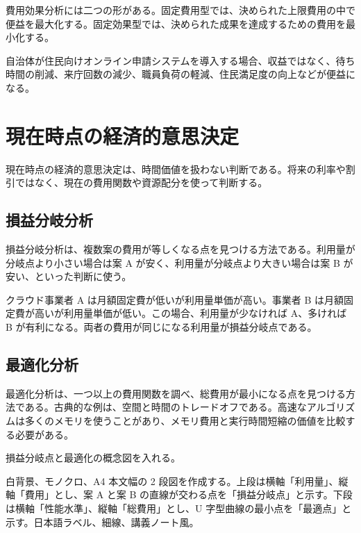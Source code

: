 \documentclass[a4paper,11pt]{article}
\begin{document}
費用効果分析には二つの形がある。固定費用型では、決められた上限費用の中で便益を最大化する。固定効果型では、決められた成果を達成するための費用を最小化する。

\begin{examplebox}
自治体が住民向けオンライン申請システムを導入する場合、収益ではなく、待ち時間の削減、来庁回数の減少、職員負荷の軽減、住民満足度の向上などが便益になる。
\end{examplebox}

\section{現在時点の経済的意思決定}

現在時点の経済的意思決定は、時間価値を扱わない判断である。将来の利率や割引ではなく、現在の費用関数や資源配分を使って判断する。

\subsection{損益分岐分析}

損益分岐分析は、複数案の費用が等しくなる点を見つける方法である。利用量が分岐点より小さい場合は案 A が安く、利用量が分岐点より大きい場合は案 B が安い、といった判断に使う。

\begin{examplebox}
クラウド事業者 A は月額固定費が低いが利用量単価が高い。事業者 B は月額固定費が高いが利用量単価が低い。この場合、利用量が少なければ A、多ければ B が有利になる。両者の費用が同じになる利用量が損益分岐点である。
\end{examplebox}

\subsection{最適化分析}

最適化分析は、一つ以上の費用関数を調べ、総費用が最小になる点を見つける方法である。古典的な例は、空間と時間のトレードオフである。高速なアルゴリズムは多くのメモリを使うことがあり、メモリ費用と実行時間短縮の価値を比較する必要がある。

\begin{todobox}
損益分岐点と最適化の概念図を入れる。
\end{todobox}
\begin{promptbox}
白背景、モノクロ、A4 本文幅の 2 段図を作成する。上段は横軸「利用量」、縦軸「費用」とし、案 A と案 B の直線が交わる点を「損益分岐点」と示す。下段は横軸「性能水準」、縦軸「総費用」とし、U 字型曲線の最小点を「最適点」と示す。日本語ラベル、細線、講義ノート風。
\end{promptbox}
\end{document}

